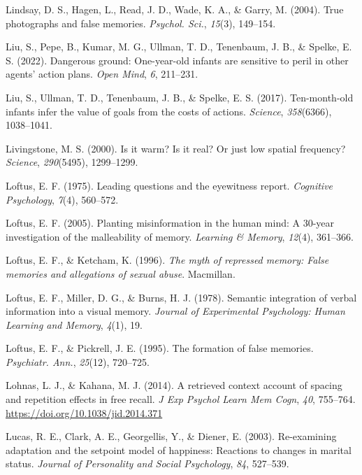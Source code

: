\documentclass[
]{krantz}
\newlength{\cslhangindent}
\newenvironment{CSLReferences}[2] %
 {\begin{list}{}{%
  \setlength{\itemindent}{0pt}
  \setlength{\leftmargin}{0pt}
  \setlength{\parsep}{0pt}
  \ifodd #1
   \setlength{\leftmargin}{\cslhangindent}
   \setlength{\itemindent}{-1\cslhangindent}
  \fi
  \setlength{\itemsep}{#2\baselineskip}}}
 {\end{list}}
\begin{document}
\begin{CSLReferences}{1}{0}
Lindsay, D. S., Hagen, L., Read, J. D., Wade, K. A., \& Garry, M. (2004). True photographs and false memories. \emph{Psychol. Sci.}, \emph{15}(3), 149--154.

Liu, S., Pepe, B., Kumar, M. G., Ullman, T. D., Tenenbaum, J. B., \& Spelke, E. S. (2022). Dangerous ground: One-year-old infants are sensitive to peril in other agents' action plans. \emph{Open Mind}, \emph{6}, 211--231.

Liu, S., Ullman, T. D., Tenenbaum, J. B., \& Spelke, E. S. (2017). Ten-month-old infants infer the value of goals from the costs of actions. \emph{Science}, \emph{358}(6366), 1038--1041.

Livingstone, M. S. (2000). Is it warm? Is it real? Or just low spatial frequency? \emph{Science}, \emph{290}(5495), 1299--1299.

Loftus, E. F. (1975). Leading questions and the eyewitness report. \emph{Cognitive Psychology}, \emph{7}(4), 560--572.

Loftus, E. F. (2005). Planting misinformation in the human mind: A 30-year investigation of the malleability of memory. \emph{Learning \& Memory}, \emph{12}(4), 361--366.

Loftus, E. F., \& Ketcham, K. (1996). \emph{The myth of repressed memory: False memories and allegations of sexual abuse}. Macmillan.

Loftus, E. F., Miller, D. G., \& Burns, H. J. (1978). Semantic integration of verbal information into a visual memory. \emph{Journal of Experimental Psychology: Human Learning and Memory}, \emph{4}(1), 19.

Loftus, E. F., \& Pickrell, J. E. (1995). The formation of false memories. \emph{Psychiatr. Ann.}, \emph{25}(12), 720--725.

Lohnas, L. J., \& Kahana, M. J. (2014). A retrieved context account of spacing and repetition effects in free recall. \emph{J Exp Psychol Learn Mem Cogn}, \emph{40}, 755--764. \url{https://doi.org/10.1038/jid.2014.371}

Lucas, R. E., Clark, A. E., Georgellis, Y., \& Diener, E. (2003). Re-examining adaptation and the setpoint model of happiness: Reactions to changes in marital status. \emph{Journal of Personality and Social Psychology}, \emph{84}, 527--539.


\end{CSLReferences}
\end{document}

